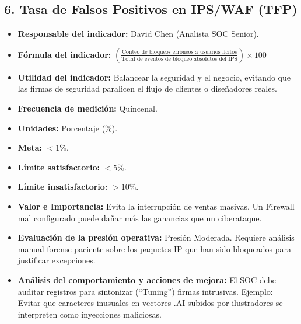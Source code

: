 \documentclass[11pt,a4paper]{article}
\begin{document}
\subsection{6. Tasa de Falsos Positivos en IPS/WAF (TFP)}
\begin{itemize}[label={--}, itemsep=0.1cm]
    \item \textbf{Responsable del indicador:} David Chen (Analista SOC Senior).
    \item \textbf{Fórmula del indicador:} $\left(\frac{\text{Conteo de bloqueos erróneos a usuarios lícitos}}{\text{Total de eventos de bloqueo absolutos del IPS}}\right) \times 100$
    \item \textbf{Utilidad del indicador:} Balancear la seguridad y el negocio, evitando que las firmas de seguridad paralicen el flujo de clientes o diseñadores reales.
    \item \textbf{Frecuencia de medición:} Quincenal.
    \item \textbf{Unidades:} Porcentaje (\%).
    \item \textbf{Meta:} $< 1\%$.
    \item \textbf{Límite satisfactorio:} $< 5\%$.
    \item \textbf{Límite insatisfactorio:} $> 10\%$.
    \item \textbf{Valor e Importancia:} Evita la interrupción de ventas masivas. Un Firewall mal configurado puede dañar más las ganancias que un ciberataque.
    \item \textbf{Evaluación de la presión operativa:} Presión Moderada. Requiere análisis manual forense paciente sobre los paquetes IP que han sido bloqueados para justificar excepciones.
    \item \textbf{Análisis del comportamiento y acciones de mejora:} El SOC debe auditar registros para sintonizar (\enquote{Tuning}) firmas intrusivas. Ejemplo: Evitar que caracteres inusuales en vectores .AI subidos por ilustradores se interpreten como inyecciones maliciosas.
\end{itemize}
\end{document}
